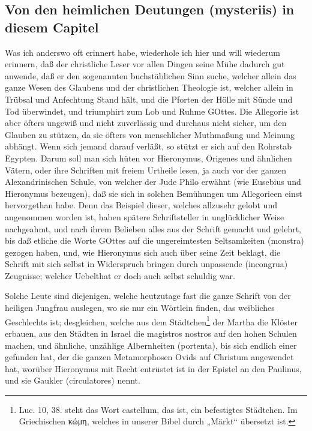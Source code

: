 \subsection{Von den heimlichen Deutungen (mysteriis) in diesem Capitel}

Was ich anderswo oft erinnert habe, wiederhole ich hier und will wiederum erinnern, daß der christliche Leser vor allen Dingen seine Mühe dadurch gut anwende, daß er den sogenannten buchstäblichen Sinn suche, welcher allein das ganze Wesen des Glaubens und der christlichen Theologie ist, welcher allein in Trübsal und Anfechtung Stand hält, und die Pforten der Hölle mit Sünde und Tod überwindet, und triumphirt zum Lob und Ruhme GOttes. Die
Allegorie ist aber öfters ungewiß und nicht zuverlässig und durchaus nicht sicher, um den Glauben zu stützen, da sie öfters von menschlicher Muthmaßung und Meinung abhängt. Wenn sich jemand darauf verläßt, so stützt er sich auf den Rohrstab Egypten. Darum soll man sich hüten vor Hieronymus, Origenes und ähnlichen Vätern, oder ihre Schriften mit freiem Urtheile lesen, ja auch vor der ganzen Alexandrinischen Schule, von welcher der Jude Philo erwähnt (wie Eusebius und Hieronymus bezeugen), daß sie sich in solchen Bemühungen um Allegorieen einst hervorgethan habe. Denn das Beispiel dieser, welches allzusehr gelobt und angenommen worden ist, haben spätere Schriftsteller in unglücklicher Weise nachgeahmt, und nach ihrem Belieben alles aus der Schrift gemacht und gelehrt, bis daß etliche die Worte GOttes auf die ungereimtesten Seltsamkeiten (monstra) gezogen haben, und, wie Hieronymus sich auch über seine Zeit beklagt, die Schrift mit sich selbst in Widerspruch bringen durch unpassende (incongrua) Zeugnisse; welcher Uebelthat er doch auch selbst schuldig war.

Solche Leute sind diejenigen, welche heutzutage fast die ganze Schrift von der heiligen Jungfrau auslegen, wo sie nur ein Wörtlein finden, das weibliches Geschlechts ist; desgleichen, welche aus dem Städtchen\footnote{Luc. 10, 38. steht das Wort castellum, das ist, ein befestigtes Städtchen. Im Griechischen κώμη, welches in unserer Bibel durch „Märkt“ übersetzt ist.} der Martha die Klöster erbauen, aus den Städten in Israel die magistros nostros auf den hohen Schulen machen, und ähnliche, unzählige Albernheiten (portenta), bis sich endlich einer gefunden hat, der die ganzen Metamorphosen Ovids auf Christum angewendet hat, worüber Hieronymus mit Recht entrüstet ist in der Epistel an den Paulinus, und sie Gaukler (circulatores) nennt.

